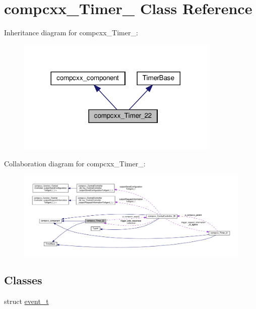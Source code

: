 \hypertarget{classcompcxx__Timer__22}{}\section{compcxx\+\_\+\+Timer\+\_ Class Reference}
\label{classcompcxx__Timer__22}


Inheritance diagram for compcxx\+\_\+\+Timer\+\_\+:\nopagebreak
\begin{figure}[H]
\begin{center}
\leavevmode
\includegraphics[width=272pt]{classcompcxx__Timer__22__inherit__graph}
\end{center}
\end{figure}


Collaboration diagram for compcxx\+\_\+\+Timer\+\_\+:\nopagebreak
\begin{figure}[H]
\begin{center}
\leavevmode
\includegraphics[width=350pt]{classcompcxx__Timer__22__coll__graph}
\end{center}
\end{figure}
\subsection*{Classes}
\begin{DoxyCompactItemize}
\item 
struct \hyperlink{structcompcxx__Timer__22_1_1event__t}{event\+\_\+t}
\end{DoxyCompactItemize}
